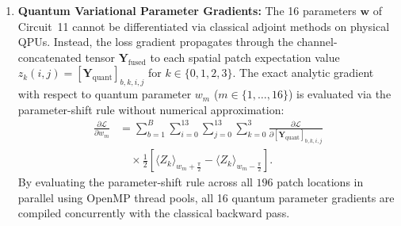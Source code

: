 \documentclass[journal]{IEEEtran}
\begin{document}
\begin{enumerate}
\begin{align}
    &\quad \times \sigma'\left([\mathbf{Z}_{\mathrm{class}}]_{b, c_{\mathrm{out}}, i, j}\right) \nonumber \\
    &\quad \times \tilde{\mathbf{X}}_{b, 0}(2i + u - 1, \, 2j + v - 1),
    \label{eq:conv_kernel_gradient_explicit}
    \end{align}
    where $\tilde{\mathbf{X}}$ is the zero-padded input image, and the additive bias gradient is:
    \begin{equation}
    \frac{\partial \mathcal{L}}{\partial [\mathbf{b}_{\mathrm{c}}]_{c_{\mathrm{out}}}} = \sum_{b=1}^B \sum_{i=0}^{13} \sum_{j=0}^{13} \frac{\partial \mathcal{L}}{\partial [\mathbf{Y}_{\mathrm{class}}]_{b, c_{\mathrm{out}}, i, j}} \cdot \sigma'\left([\mathbf{Z}_{\mathrm{class}}]_{b, c_{\mathrm{out}}, i, j}\right).
    \label{eq:conv_bias_gradient_explicit}
    \end{equation}
    These classical gradient tensor operations execute on GPU via highly optimized CUDA kernels in ${<}2.5\,\mathrm{ms}$ per batch.

    \item \textbf{Quantum Variational Parameter Gradients:} The 16 parameters $\mathbf{w}$ of Circuit~11 cannot be differentiated via classical adjoint methods on physical QPUs. Instead, the loss gradient propagates through the channel-concatenated tensor $\mathbf{Y}_{\mathrm{fused}}$ to each spatial patch expectation value $z_k(i, j) = [\mathbf{Y}_{\mathrm{quant}}]_{b, k, i, j}$ for $k \in \{0, 1, 2, 3\}$. The exact analytic gradient with respect to quantum parameter $w_m$ ($m \in \{1, \dots, 16\}$) is evaluated via the parameter-shift rule without numerical approximation:
    \begin{align}
    \frac{\partial \mathcal{L}}{\partial w_m} &= \sum_{b=1}^B \sum_{i=0}^{13} \sum_{j=0}^{13} \sum_{k=0}^3 \frac{\partial \mathcal{L}}{\partial [\mathbf{Y}_{\mathrm{quant}}]_{b,k,i,j}} \nonumber \\
    &\quad \times \frac{1}{2}\left[ \langle Z_k \rangle_{w_m + \frac{\pi}{2}} - \langle Z_k \rangle_{w_m - \frac{\pi}{2}} \right].
    \label{eq:hybrid_parameter_shift_backprop}
    \end{align}
    By evaluating the parameter-shift rule across all $196$ patch locations in parallel using OpenMP thread pools, all 16 quantum parameter gradients are compiled concurrently with the classical backward pass.


\end{enumerate}
\end{document}
